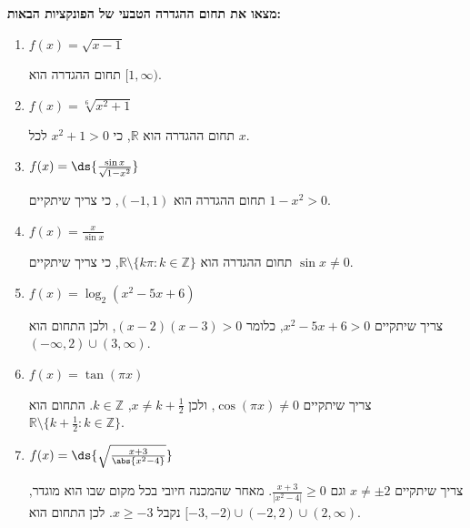 \textbf{מצאו את תחום ההגדרה הטבעי של הפונקציות הבאות:}
\begin{enumerate}
\item $f(x)=\sqrt{x-1}$
\begin{solbox}
תחום ההגדרה הוא $[1,\infty)$.
\end{solbox}

\item $f(x)=\sqrt[6]{x^2+1}$
\begin{solbox}
תחום ההגדרה הוא $\mathbb{R}$, כי $x^2+1>0$ לכל $x$.
\end{solbox}

\item  $f(x)=\ds{\frac{\sin x}{\sqrt{1-x^2}}}$
\begin{solbox}
תחום ההגדרה הוא $(-1,1)$, כי צריך שיתקיים
$1-x^2>0$.
\end{solbox}

\item $f(x)=\frac{x}{\sin x}$
\begin{solbox}
תחום ההגדרה הוא $\mathbb{R}\setminus\{k\pi:k\in\mathbb{Z}\}$,
כי צריך שיתקיים
$\sin x\neq0$.
\end{solbox}

\item $f(x)=\log_2{(x^2-5x+6)}$
\begin{solbox}
צריך שיתקיים $x^2-5x+6>0$, כלומר $(x-2)(x-3)>0$, ולכן התחום הוא $(-\infty,2)\cup(3,\infty)$.
\end{solbox}

\item $f(x)=\tan(\pi x)$
\begin{solbox}
צריך שיתקיים $\cos(\pi x)\neq0$, ולכן $x\neq k+\frac12$, $k\in\mathbb{Z}$. התחום הוא $\mathbb{R}\setminus\{k+\frac12:k\in\mathbb{Z}\}$.
\end{solbox}

\item $f(x)=\ds{\sqrt{\frac{x+3}{\abs{x^2-4}}}}$
\begin{solbox}
צריך שיתקיים $x\neq\pm2$ וגם $\frac{x+3}{|x^2-4|}\geq0$. מאחר שהמכנה חיובי בכל מקום שבו הוא מוגדר, נקבל $x\geq-3$. לכן התחום הוא
$[-3,-2)\cup(-2,2)\cup(2,\infty)$.
\end{solbox}


\end{enumerate}
